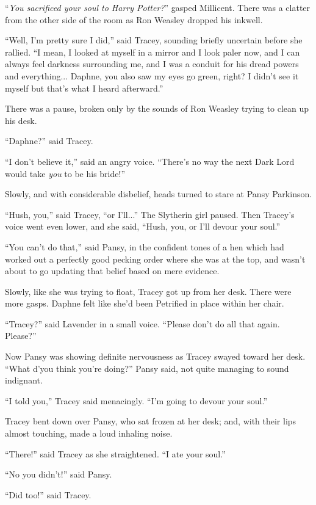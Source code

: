 ``\emph{You sacrificed your soul to Harry Potter?}'' gasped Millicent. There was a clatter from the other side of the room as Ron Weasley dropped his inkwell.

``Well, I'm pretty sure I did,'' said Tracey, sounding briefly uncertain before she rallied. ``I mean, I looked at myself in a mirror and I look paler now, and I can always feel darkness surrounding me, and I was a conduit for his dread powers and everything... Daphne, you also saw my eyes go green, right? I didn't see it myself but that's what I heard afterward.''

There was a pause, broken only by the sounds of Ron Weasley trying to clean up his desk.

``Daphne?'' said Tracey.

``I don't believe it,'' said an angry voice. ``There's no way the next Dark Lord would take \emph{you} to be his bride!''

Slowly, and with considerable disbelief, heads turned to stare at Pansy Parkinson.

``Hush, you,'' said Tracey, ``or I'll...'' The Slytherin girl paused. Then Tracey's voice went even lower, and she said, ``Hush, you, or I'll devour your soul.''

``You can't do that,'' said Pansy, in the confident tones of a hen which had worked out a perfectly good pecking order where she was at the top, and wasn't about to go updating that belief based on mere evidence.

Slowly, like she was trying to float, Tracey got up from her desk. There were more gasps. Daphne felt like she'd been Petrified in place within her chair.

``Tracey?'' said Lavender in a small voice. ``Please don't do all that again. Please?''

Now Pansy was showing definite nervousness as Tracey swayed toward her desk. ``What d'you think you're doing?'' Pansy said, not quite managing to sound indignant.

``I told you,'' Tracey said menacingly. ``I'm going to devour your soul.''

Tracey bent down over Pansy, who sat frozen at her desk; and, with their lips almost touching, made a loud inhaling noise.

``There!'' said Tracey as she straightened. ``I ate your soul.''

``No you didn't!'' said Pansy.

``Did too!'' said Tracey.

